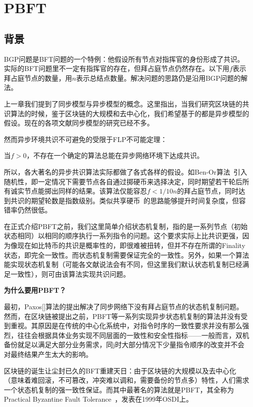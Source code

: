 \section{PBFT}
\subsection{背景}
BGP问题是BFT问题的一个特例：他假设所有节点对指挥官的身份形成了共识。实际的BFT问题里不一定有指挥官的存在，但拜占庭节点仍然存在。以下用$f$表示拜占庭节点的数量，用$n$表示总结点数量。解决问题的思路仍是沿用BGP问题的解法。

上一章我们提到了同步模型与异步模型的概念。这里指出，当我们研究区块链的共识算法的时候，鉴于区块链的大规模和去中心化，我们希望基于的都是异步模型的假设。现在的各项文献同步模型的研究已经不多。

然而异步环境共识不可避免的受限于FLP不可能定理：
\begin{theorem}
	当$f>0$，不存在一个确定的算法总能在异步网络环境下达成共识。
\end{theorem}
所以，各大著名的异步共识算法实际都做了各式各样的假设。如Ben-Or算法~\cite{ben1983another}引入随机性，即一定情况下需要节点各自通过掷硬币来选择决定，同时期望若干轮后所有诚实节点能掷出同样的结果。该算法仅能容忍$f<1/10n$的拜占庭节点，同时达到共识的期望轮数是指数级别。类似共享硬币~\cite{bracha1987asynchronous}的思路能够提升时间复杂度，但容错率仍然很低。

在正式介绍PBFT之前，我们这里简单介绍状态机复制，指的是一系列节点（初始状态相同）以相同的顺序执行一系列指令的问题。这个要求实际上比共识更强，因为像现在如比特币的共识是概率性的，即很难被扭转，但并不存在所谓的Finality状态，即完全一致性。而状态机复制需要保证完全的一致性。另外，如果一个算法能实现状态机复制（可能各文献说法会有不同，但这里我们默认状态机复制已经满足一致性），则可由该算法实现共识问题。

\textbf{为什么要用PBFT？}

最初，Paxos[]算法的提出解决了同步网络下没有拜占庭节点的状态机复制问题。然而，在区块链被提出之前，PBFT等一系列实现异步状态机复制的算法并没有受到重视。其原因是在传统的中心化系统中，对指令时序的一致性要求并没有那么强烈，往往会根据具体业务实现不同层面的一致性和安全性指标——一般而言，双机备份就足以满足大部分业务需求，同j时大部分情况下少量指令顺序的改变并不会对最终结果产生太大的影响。

区块链的诞生让尘封已久的BFT重建天日：由于区块链的大规模以及去中心化（意味着难回滚，不可篡改，冲突难以调和，需要备份的节点多）特性，人们需求一个状态机复制的强一致性保证。而其中最著名的算法就是PBFT，其全称为Practical Byzantine Fault Tolerance~\cite{castro1999practical}，发表在1999年OSDI上。

